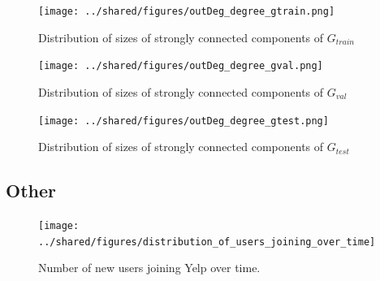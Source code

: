 \documentclass[letterpaper, 10 pt, conference]{ieeeconf}  %
\begin{document}
\begin{figure}[h!]
\centering
\texttt{[image: ../shared/figures/outDeg\_degree\_gtrain.png]}
\caption{Distribution of sizes of strongly connected components of $G_{train}$}
\label{fig:degree_distribution_g_train}
\end{figure}
\begin{figure}[h!]
\centering
\texttt{[image: ../shared/figures/outDeg\_degree\_gval.png]}
\caption{Distribution of sizes of strongly connected components of $G_{val}$}
\label{fig:degree_distribution_g_val}
\end{figure}
\begin{figure}[h!]
\centering
\texttt{[image: ../shared/figures/outDeg\_degree\_gtest.png]}
\caption{Distribution of sizes of strongly connected components of $G_{test}$}
\label{fig:degree_distribution_g_test}
\end{figure}


\subsection{Other}


\begin{figure}[h!]
\centering
\texttt{[image: ../shared/figures/distribution\_of\_users\_joining\_over\_time]}
\caption{Number of new users joining Yelp over time.}
\label{fig:users_join_over_time}
\end{figure}
\end{document}
